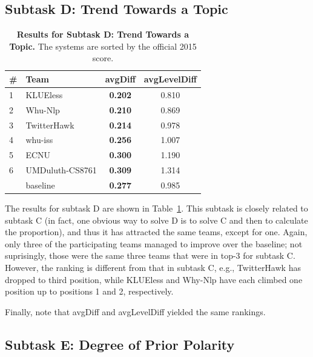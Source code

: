 \documentclass[11pt]{article}
\begin{document}
\subsection{Subtask D: Trend Towards a Topic}


\begin{table}[t!]
\begin{center}
\small{
\begin{tabular}{llcc}
\hline
\bf \# & \bf Team & \bf avgDiff	& \bf avgLevelDiff\\ 
\hline
   1 & KLUEless & \bf 0.202 & 0.810\\
   2 & Whu-Nlp & \bf 0.210 & 0.869\\
   3 & TwitterHawk & \bf 0.214 & 0.978\\
   4 & whu-iss & \bf 0.256 & 1.007\\
   5 & ECNU & \bf 0.300 & 1.190\\
   6 & UMDuluth-CS8761 & \bf 0.309 & 1.314\\
\hline
     & baseline & \bf 0.277 & 0.985\\
\hline
\end{tabular}
}
\caption{\textbf{Results for Subtask D: Trend Towards a Topic.}
             The systems are sorted by the official 2015 score.}
\label{tab:res-subtaskD}
\end{center}
\vspace*{-5mm}
\end{table}

The results for subtask D are shown in Table~\ref{tab:res-subtaskD}.
This subtask is closely related to subtask C
(in fact, one obvious way to solve D is to solve C and then to calculate the proportion),
and thus it has attracted the same teams, except for one.
Again, only three of the participating teams managed to improve over the baseline;
not suprisingly, those were the same three teams that were in top-3 for subtask C.
However, the ranking is different from that in subtask C,
e.g., TwitterHawk has dropped to third position,
while KLUEless and Why-Nlp have each climbed one position up
to positions 1 and 2, respectively.

Finally, note that avgDiff and avgLevelDiff yielded the same rankings.





\subsection{Subtask E: Degree of Prior Polarity}
\end{document}
